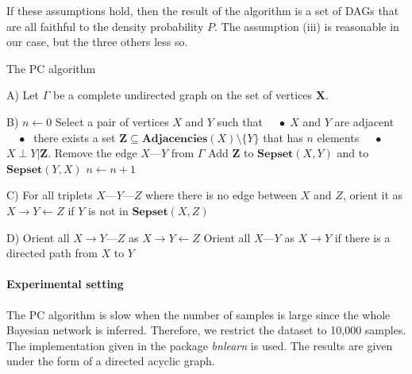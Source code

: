 If these assumptions hold, then the result of the algorithm is a set of DAGs
that are all faithful to the density probability $P$. The assumption (iii) is
reasonable in our case, but the three others less so.

\begin{algorithm}
    \caption{The PC algorithm}
    \label{alg:pc}
    \begin{algorithmic}
        \State A) Let $\Gamma$ be a complete undirected graph on the set of
        vertices $\bm X$.

        \State B) $n\gets 0$
        \Repeat
            \Repeat
                \State Select a pair of vertices $X$ and $Y$ such that
                \State $\quad\bullet\;X$ and $Y$ are adjacent
                \State $\quad\bullet\;$ there exists a set $\bm
                Z\subseteq\textbf{Adjacencies}(X)\setminus \{Y\}$ that has $n$
                elements
                \State $\quad\bullet\;$ $X\perp Y|\bm Z$.
                \State Remove the edge $X \text{---} Y$ from $\Gamma$
                \State Add $\bm Z$ to $\textbf{Sepset}(X, Y)$ and to $\textbf{Sepset}(Y, X)$
            \State $n\gets n+1$

        \State C) For all triplets $X \text{---} Y \text{---} Z$ where there is
        no edge between $X$ and $Z$, orient it as $X\rightarrow Y \leftarrow Z$
        if $Y$ is not in $\textbf{Sepset}(X, Z)$

        \State D)
        \Repeat
            \State Orient all $X\rightarrow Y\text{---} Z$ as $X\rightarrow Y
            \leftarrow Z$
            \State Orient all $X\text{---}Y$ as $X\rightarrow Y$ if there is
            a directed path from $X$ to $Y$
    \end{algorithmic}
\end{algorithm}

\paragraph{Experimental setting} The PC algorithm is slow when the number of
samples is large since the whole Bayesian network is inferred. Therefore, we
restrict the dataset to 10,000 samples. The implementation given in the package
\emph{bnlearn} is used. The results are given under the form of a directed
acyclic graph.

